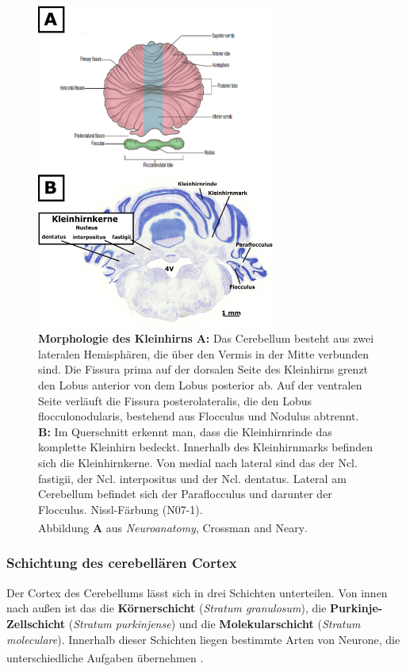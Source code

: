 \documentclass[12pt,a4paper,pdftex]{article}
\begin{document}
\begin{figure}[H]
    \centering
    \includegraphics[width=0.7\textwidth]{pictures/Bilder_Laura/kleinhirn_ausen.png}
    \caption[Morphologie des Kleinhirns]{\textbf{Morphologie des Kleinhirns} \textbf{A:} Das Cerebellum besteht aus zwei lateralen Hemisphären, die über den Vermis in der Mitte verbunden sind. Die Fissura prima auf der dorsalen Seite des Kleinhirns grenzt den Lobus anterior von dem Lobus posterior ab. Auf der ventralen Seite verläuft die Fissura posterolateralis, die den Lobus flocculonodularis, bestehend aus Flocculus und Nodulus abtrennt. \textbf{B:} Im Querschnitt erkennt man, dass die Kleinhirnrinde das komplette Kleinhirn bedeckt. Innerhalb des Kleinhirnmarks befinden sich die Kleinhirnkerne. Von medial nach lateral sind das der Ncl. fastigii, der Ncl. interpositus und der Ncl. dentatus. Lateral am Cerebellum befindet sich der Paraflocculus und darunter der Flocculus. Nissl-Färbung (N07-1).\\ Abbildung \textbf{A} aus \textit{Neuroanatomy}, Crossman and Neary\textsuperscript{\cite[11]{crossman2014neuroanatomy}}.}
    \label{fig:morph_kleinhirn}
\end{figure}

\subsubsection{Schichtung des cerebellären Cortex}
Der Cortex des Cerebellums lässt sich in drei Schichten unterteilen. Von innen nach außen ist das die \textbf{Körnerschicht} (\textit{Stratum granulosum}), die \textbf{Purkinje-Zellschicht} (\textit{Stratum purkinjense}) und die \textbf{Molekularschicht} (\textit{Stratum moleculare}). Innerhalb dieser Schichten liegen bestimmte Arten von Neurone, die unterschiedliche Aufgaben übernehmen \textsuperscript{\cite[7]{trepel2011neuroanatomie}}.     
\end{document}
